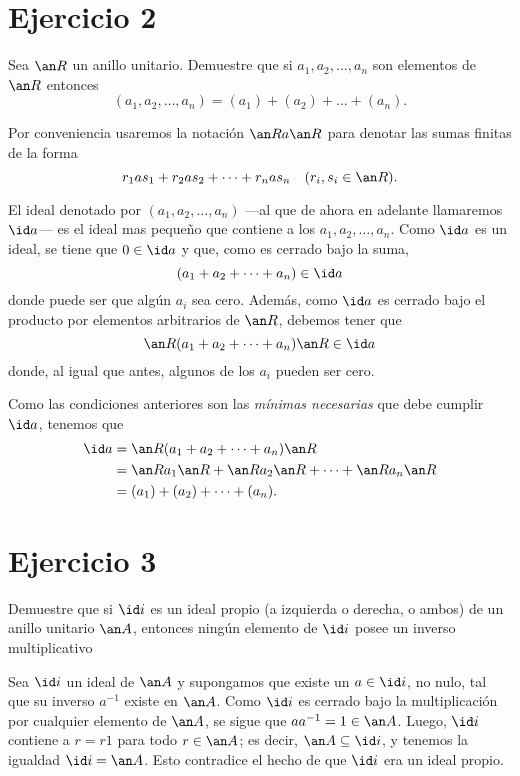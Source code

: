 \documentclass[twocolumn,tarea]{customclass}
\begin{document}
\section*{Ejercicio 2}
	Sea $\an R$ un anillo unitario. Demuestre que si $a_1,a_2,\dots,a_n$ son elementos de $\an R$ entonces
\[ (a_1,a_2,\dots,a_n) = (a_1) + (a_2) + \dots + (a_n). \]
\begin{sol}
	Por conveniencia usaremos la notación $\an Ra\an R$ para denotar las sumas finitas de la forma 
	\[ r_1as_1+r_2as_2+\dots+r_nas_n \quad (r_i,s_i\in\an R). \]
	
	El ideal denotado por $(a_1,a_2,\dots,a_n)$ ---al que de ahora en adelante llamaremos $\id a$--- es el ideal mas pequeño que contiene a los $a_1,a_2,\dots,a_n$. Como $\id a$ es un ideal, se tiene que $0\in\id a$ y que, como es cerrado bajo la suma,
	\[ (a_1+a_2+\dots+a_n) \in\id a\]
	donde puede ser que algún $a_i$ sea cero. Además, como $\id a$ es cerrado bajo el producto por elementos arbitrarios de $\an R$, debemos tener que
	\[ \an R(a_1+a_2+\dots+a_n)\an R \in\id a \]
	donde, al igual que antes, algunos de los $a_i$ pueden ser cero. 
	
	Como las condiciones anteriores son las \textit{mínimas necesarias} que debe cumplir $\id a$, tenemos que
	\begin{align*}
	\id a &= \an R(a_1+a_2+\dots+a_n)\an R \\
	  &= \an Ra_1\an R+\an Ra_2\an R+\dots+\an Ra_n\an R \\
	  &= (a_1) + (a_2) + \dots + (a_n).
	\end{align*}
\end{sol}
\section*{Ejercicio 3}
	Demuestre que si $\id i$ es un ideal propio (a izquierda o derecha, o ambos) de un anillo unitario $\an A$, entonces ningún elemento de $\id i$ posee un inverso multiplicativo
\begin{sol}
	Sea $\id i$ un ideal de $\an A$ y supongamos que existe un $a \in \id i$, no nulo, tal que su inverso $a^{-1}$ existe en $\an A$. Como $\id i$ es cerrado bajo la multiplicación por cualquier elemento de $\an A$, se sigue que $aa^{-1}=1 \in\an A$. Luego, $\id i$ contiene a $r = r1$ para todo $r \in\an A$; es decir, $\an A \subseteq\id i$, y tenemos la igualdad $\id i=\an A$. Esto contradice el hecho de que $\id i$ era un ideal propio.
\end{sol}
\end{document}
